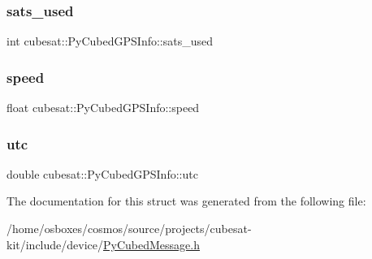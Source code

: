 \subsubsection{\texorpdfstring{sats\+\_\+used}{sats\_used}}
{\footnotesize\ttfamily int cubesat\+::\+Py\+Cubed\+G\+P\+S\+Info\+::sats\+\_\+used}

\mbox{\label{structcubesat_1_1PyCubedGPSInfo_add984c0de8a29d599599ef53e04c36e4}} 
\subsubsection{\texorpdfstring{speed}{speed}}
{\footnotesize\ttfamily float cubesat\+::\+Py\+Cubed\+G\+P\+S\+Info\+::speed}

\mbox{\label{structcubesat_1_1PyCubedGPSInfo_a9b8ffa6900d012699f34d153f7627df0}} 
\subsubsection{\texorpdfstring{utc}{utc}}
{\footnotesize\ttfamily double cubesat\+::\+Py\+Cubed\+G\+P\+S\+Info\+::utc}



The documentation for this struct was generated from the following file\+:\begin{DoxyCompactItemize}
\item 
/home/osboxes/cosmos/source/projects/cubesat-\/kit/include/device/\hyperlink{PyCubedMessage_8h}{Py\+Cubed\+Message.\+h}\end{DoxyCompactItemize}
